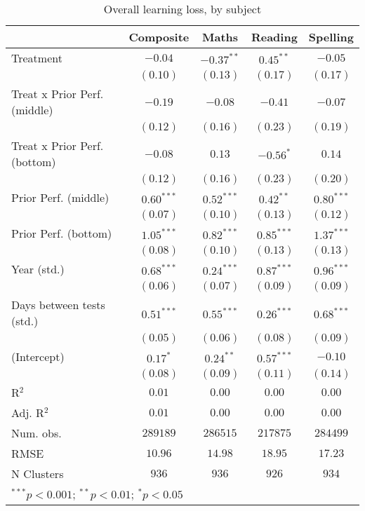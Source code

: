 
\begin{table}
\begin{center}
\begin{tabular}{l c c c c}
\hline
 & Composite & Maths & Reading & Spelling \\
\hline
Treatment                    & $-0.04$      & $-0.37^{**}$ & $0.45^{**}$  & $-0.05$      \\
                             & $(0.10)$     & $(0.13)$     & $(0.17)$     & $(0.17)$     \\
Treat x Prior Perf. (middle) & $-0.19$      & $-0.08$      & $-0.41$      & $-0.07$      \\
                             & $(0.12)$     & $(0.16)$     & $(0.23)$     & $(0.19)$     \\
Treat x Prior Perf. (bottom) & $-0.08$      & $0.13$       & $-0.56^{*}$  & $0.14$       \\
                             & $(0.12)$     & $(0.16)$     & $(0.23)$     & $(0.20)$     \\
Prior Perf. (middle)         & $0.60^{***}$ & $0.52^{***}$ & $0.42^{**}$  & $0.80^{***}$ \\
                             & $(0.07)$     & $(0.10)$     & $(0.13)$     & $(0.12)$     \\
Prior Perf. (bottom)         & $1.05^{***}$ & $0.82^{***}$ & $0.85^{***}$ & $1.37^{***}$ \\
                             & $(0.08)$     & $(0.10)$     & $(0.13)$     & $(0.13)$     \\
Year (std.)                  & $0.68^{***}$ & $0.24^{***}$ & $0.87^{***}$ & $0.96^{***}$ \\
                             & $(0.06)$     & $(0.07)$     & $(0.09)$     & $(0.09)$     \\
Days between tests (std.)    & $0.51^{***}$ & $0.55^{***}$ & $0.26^{***}$ & $0.68^{***}$ \\
                             & $(0.05)$     & $(0.06)$     & $(0.08)$     & $(0.09)$     \\
(Intercept)                  & $0.17^{*}$   & $0.24^{**}$  & $0.57^{***}$ & $-0.10$      \\
                             & $(0.08)$     & $(0.09)$     & $(0.11)$     & $(0.14)$     \\
\hline
R$^2$                        & $0.01$       & $0.00$       & $0.00$       & $0.00$       \\
Adj. R$^2$                   & $0.01$       & $0.00$       & $0.00$       & $0.00$       \\
Num. obs.                    & $289189$     & $286515$     & $217875$     & $284499$     \\
RMSE                         & $10.96$      & $14.98$      & $18.95$      & $17.23$      \\
N Clusters                   & $936$        & $936$        & $926$        & $934$        \\
\hline
\multicolumn{5}{l}{\scriptsize{$^{***}p<0.001$; $^{**}p<0.01$; $^{*}p<0.05$}}
\end{tabular}
\caption{Overall learning loss, by subject}
\label{table:overall}
\end{center}
\end{table}
